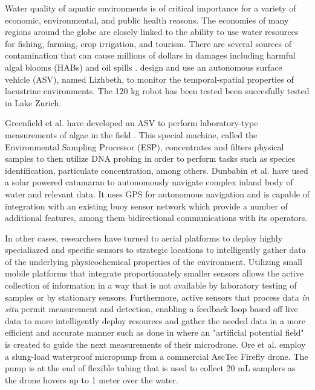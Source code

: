 		Water quality of aquatic environments is of critical importance for a variety of economic, environmental, and public health reasons. The economies of many regions around the globe are closely linked to the ability to use water resources for fishing, farming, crop irrigation, and tourism. There are several sources of contamination that can cause millions of dollars in damages including harmful algal blooms (HABs) and oil spills \cite{EPA2015a}. \cite{Hitz2012} design and use an autonomous surface vehicle (ASV), named Lizhbeth,  to monitor the temporal-spatial properties of lacustrine environments. The 120 kg robot has been tested been succesfully tested in Lake Zurich. 

		Greenfield et al. have developed an ASV to perform laboratory-type measurements of algae in the field \cite{Greenfield2008}. This special machine, called the Environmental Sampling Processor (ESP), concentrates and filters physical samples to then utilize DNA probing in order to perform tasks such as species identification, particulate concentration, among others. Dunbabin et al. \cite{Dunbabin2009} have used a solar powered catamaran to autonomously navigate complex inland body of water and relevant data. It uses GPS for autonomous navigation and is capable of integration with an existing buoy sensor network which provide a number of additional features, among them bidirectional communications with its operators.  


		In other cases, researchers have turned to aerial platforms to deploy highly specialiazed and specific sensors to strategic locations to intelligently gather data of the underlying physicochemical properties of the environment. Utilizing small mobile platforms that integrate proportionately smaller sensors allows the active collection of information in a way that is not available by laboratory testing of samples or by stationary sensors. Furthermore, active sensors that process data \emph{in situ} permit measurement and detection, enabling a feedback loop based off live data to more intelligently deploy resources and gather the needed data in a more efficient and accurate manner such as done in \cite{Neumann2012} where an "artificial potential field" is created to guide the next measurements of their microdrone. 
		Ore et al. \cite{Ore2015} employ a slung-load waterproof micropump from  a commercial AscTec Firefly drone. The pump is at the end of flexible tubing that is used to collect 20 mL samplers as the drone hovers up to 1 meter over the water. 

